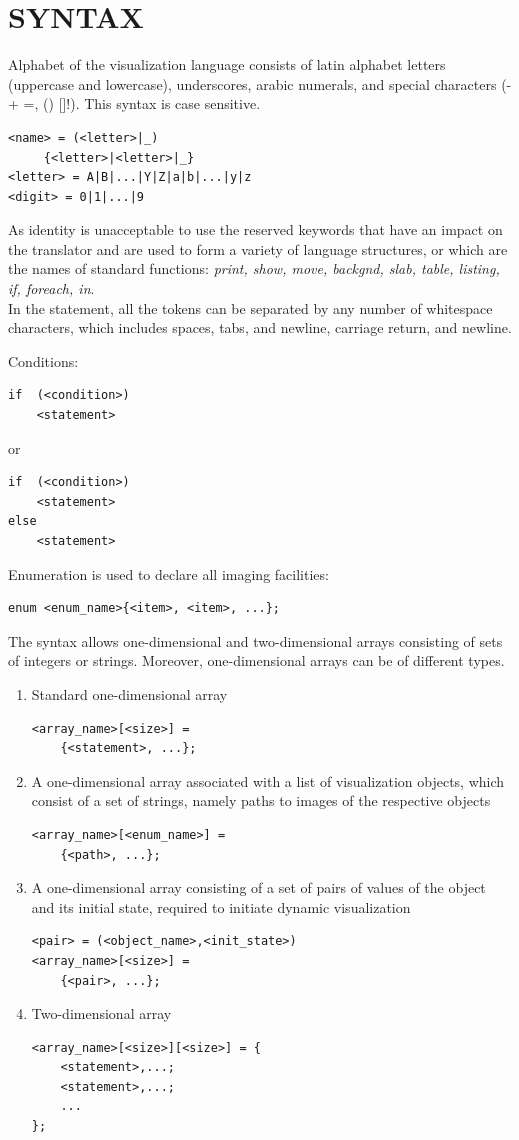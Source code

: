 \documentclass[a4paper, 10pt, conference]{ieeeconf}
\begin{document}
\section{SYNTAX}
Alphabet of the visualization language consists of latin alphabet letters (uppercase and lowercase), underscores, arabic numerals, and special characters (- + =, {} () []!). This syntax is case sensitive.
\begin{lstlisting}
<name> = (<letter>|_)
	 {<letter>|<letter>|_}
<letter> = A|B|...|Y|Z|a|b|...|y|z
<digit> = 0|1|...|9
\end{lstlisting}
As identity is unacceptable to use the reserved keywords that have an impact on the translator and are used to form a variety of language structures, or which are the names of standard functions:
\textit{print, show, move, backgnd, slab, table, listing, if, foreach, in}.\\

In the statement, all the tokens can be separated by any number of whitespace characters, which includes spaces, tabs, and newline, carriage return, and newline.

Conditions:
\begin{lstlisting}
if  (<condition>)
	<statement>
\end{lstlisting} or
\begin{lstlisting}
if  (<condition>)
	<statement>
else
	<statement>
\end{lstlisting}
Enumeration is used to declare all imaging facilities:
\begin{lstlisting}
enum <enum_name>{<item>, <item>, ...};
\end{lstlisting}

The syntax allows one-dimensional and two-dimensional arrays consisting of sets of integers or strings. Moreover, one-dimensional arrays can be of different types.

\begin{enumerate}
\item Standard one-dimensional array
\begin{lstlisting}
<array_name>[<size>] = 
	{<statement>, ...};
\end{lstlisting}
\item A one-dimensional array associated with a list of visualization objects, which consist of a set of strings, namely paths to images of the respective objects
\begin{lstlisting}
<array_name>[<enum_name>] = 
	{<path>, ...};
\end{lstlisting}
\item A one-dimensional array consisting of a set of pairs of values of the object and its initial state, required to initiate dynamic visualization
\begin{lstlisting}
<pair> = (<object_name>,<init_state>)
<array_name>[<size>] = 
	{<pair>, ...};
\end{lstlisting}
\item Two-dimensional array
\begin{lstlisting}
<array_name>[<size>][<size>] = {
	<statement>,...;
	<statement>,...;
	...
};
\end{lstlisting}
\end{enumerate}
\end{document}
